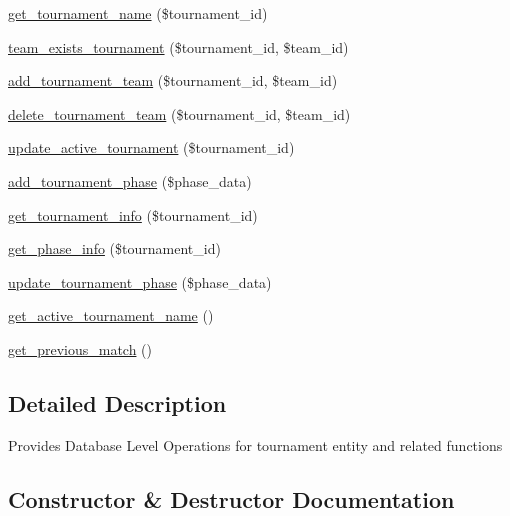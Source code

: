 \begin{DoxyCompactItemize}
\hyperlink{class_tournament__model_a7404e01586163cf04959f4748bcd7821}{get\+\_\+tournament\+\_\+name} (\$tournament\+\_\+id)
\item 
\hyperlink{class_tournament__model_a8bed35a930e28709458de74520659750}{team\+\_\+exists\+\_\+tournament} (\$tournament\+\_\+id, \$team\+\_\+id)
\item 
\hyperlink{class_tournament__model_a8df521ff35ba8f054f6d9d65da3d66a8}{add\+\_\+tournament\+\_\+team} (\$tournament\+\_\+id, \$team\+\_\+id)
\item 
\hyperlink{class_tournament__model_a68a322bc7c8b71b81cb1e8f8ee019ac0}{delete\+\_\+tournament\+\_\+team} (\$tournament\+\_\+id, \$team\+\_\+id)
\item 
\hyperlink{class_tournament__model_a3ae959338caabf554850c1f4ac954726}{update\+\_\+active\+\_\+tournament} (\$tournament\+\_\+id)
\item 
\hyperlink{class_tournament__model_adea7ad02f9a5fc39d50c18d80e5cc093}{add\+\_\+tournament\+\_\+phase} (\$phase\+\_\+data)
\item 
\hyperlink{class_tournament__model_a66b95b967722916a1d1d11ffbdcd9982}{get\+\_\+tournament\+\_\+info} (\$tournament\+\_\+id)
\item 
\hyperlink{class_tournament__model_a907bb55cb08c93041706da20c8cd79b4}{get\+\_\+phase\+\_\+info} (\$tournament\+\_\+id)
\item 
\hyperlink{class_tournament__model_abde88ebb17a0c7572ad2575326028768}{update\+\_\+tournament\+\_\+phase} (\$phase\+\_\+data)
\item 
\hyperlink{class_tournament__model_a61dc6e29af1a75b337f29a1ec8cf31ae}{get\+\_\+active\+\_\+tournament\+\_\+name} ()
\item 
\hyperlink{class_tournament__model_ae9e4f853c3a51ded8eb00303a09023af}{get\+\_\+previous\+\_\+match} ()
\end{DoxyCompactItemize}


\subsection{Detailed Description}
Provides Database Level Operations for {\ttfamily tournament} entity and related functions 

\subsection{Constructor \& Destructor Documentation}
\hypertarget{class_tournament__model_a095c5d389db211932136b53f25f39685}{}

